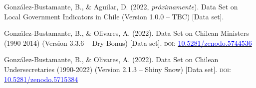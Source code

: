 





\begin{publications}

\begin{benumerate}{3}

\item{\small Gonz\'alez-Bustamante, B., \& Aguilar, D. (2022, {\itshape próximamente}). Data Set on Local Government Indicators in Chile (Version 1.0.0 -- TBC) [Data set].}\vspace{1mm}

\item{\small Gonz\'alez-Bustamante, B., \& Olivares, A. (2022). Data Set on Chilean Ministers (1990-2014) (Version 3.3.6 -- Dry Bonus) [Data set]. {\scshape doi:} \href{https://doi.org/10.5281/zenodo.5744536}{\textcolor{blue}{10.5281/zenodo.5744536}}}\vspace{1mm}

\item{Gonz\'alez-Bustamante, B., \& Olivares, A. (2022). Data Set on Chilean Undersecretaries (1990-2022) (Version 2.1.3 -- Shiny Snow) [Data set]. {\scshape doi:} \href{https://doi.org/10.5281/zenodo.5715384}{\textcolor{blue}{10.5281/zenodo.5715384}}}\vspace{1mm}

\end{benumerate}

\end{publications}


